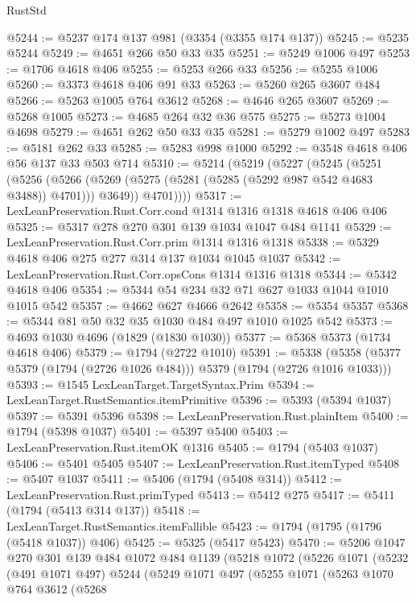 \begin{lexlean}{RustStd}
\begin{coremodule}
{\begin{coremodule}
{{{{{{{{{{{{{{@5244 := @5237 @174 @137 @981 (@3354 (@3355 @174 @137))
@5245 := @5235 @5244
@5249 := @4651 @266 @50 @33 @35
@5251 := @5249 @1006 @497
@5253 := @1706 @4618 @406
@5255 := @5253 @266 @33
@5256 := @5255 @1006
@5260 := @3373 @4618 @406 @91 @33
@5263 := @5260 @265 @3607 @484
@5266 := @5263 @1005 @764 @3612
@5268 := @4646 @265 @3607
@5269 := @5268 @1005
@5273 := @4685 @264 @32 @36 @575
@5275 := @5273 @1004 @4698
@5279 := @4651 @262 @50 @33 @35
@5281 := @5279 @1002 @497
@5283 := @5181 @262 @33
@5285 := @5283 @998 @1000
@5292 := @3548 @4618 @406 @56 @137 @33 @503 @714
@5310 := @5214
    (@5219
      (@5227
        (@5245
          (@5251
            (@5256
              (@5266 (@5269 (@5275 (@5281 (@5285 (@5292 @987 @542 @4683 @3488)) @4701))) @3649))
            @4701))))
@5317 := LexLeanPreservation.Rust.Corr.cond @1314 @1316 @1318 @4618 @406 @406
@5325 := @5317 @278 @270 @301 @139 @1034 @1047 @484 @1141
@5329 := LexLeanPreservation.Rust.Corr.prim @1314 @1316 @1318
@5338 := @5329 @4618 @406 @275 @277 @314 @137 @1034 @1045 @1037
@5342 := LexLeanPreservation.Rust.Corr.opsCons @1314 @1316 @1318
@5344 := @5342 @4618 @406
@5354 := @5344 @54 @234 @32 @71 @627 @1033 @1044 @1010 @1015 @542
@5357 := @4662 @627 @4666 @2642
@5358 := @5354 @5357
@5368 := @5344 @81 @50 @32 @35 @1030 @484 @497 @1010 @1025 @542
@5373 := @4693 @1030 @4696 (@1829 (@1830 @1030))
@5377 := @5368 @5373 (@1734 @4618 @406)
@5379 := @1794 (@2722 @1010)
@5391 := @5338 (@5358 (@5377 @5379 (@1794 (@2726 @1026 @484))) @5379 (@1794 (@2726 @1016 @1033)))
@5393 := @1545 LexLeanTarget.TargetSyntax.Prim
@5394 := LexLeanTarget.RustSemantics.itemPrimitive
@5396 := @5393 (@5394 @1037)
@5397 := @5391 @5396
@5398 := LexLeanPreservation.Rust.plainItem
@5400 := @1794 (@5398 @1037)
@5401 := @5397 @5400
@5403 := LexLeanPreservation.Rust.itemOK @1316
@5405 := @1794 (@5403 @1037)
@5406 := @5401 @5405
@5407 := LexLeanPreservation.Rust.itemTyped
@5408 := @5407 @1037
@5411 := @5406 (@1794 (@5408 @314))
@5412 := LexLeanPreservation.Rust.primTyped
@5413 := @5412 @275
@5417 := @5411 (@1794 (@5413 @314 @137))
@5418 := LexLeanTarget.RustSemantics.itemFallible
@5423 := @1794 (@1795 (@1796 (@5418 @1037)) @406)
@5425 := @5325 (@5417 @5423)
@5470 := @5206
    @1047
    @270
    @301
    @139
    @484
    @1072
    @484
    @1139
    (@5218
      @1072
      (@5226
        @1071
        (@5232
          (@491 @1071 @497)
          @5244
          (@5249
            @1071
            @497
            (@5255
              @1071
              (@5263
                @1070
                @764
                @3612
                (@5268
}}}}}}}}}}}}}}
\end{coremodule}}
\end{coremodule}
\end{lexlean}
